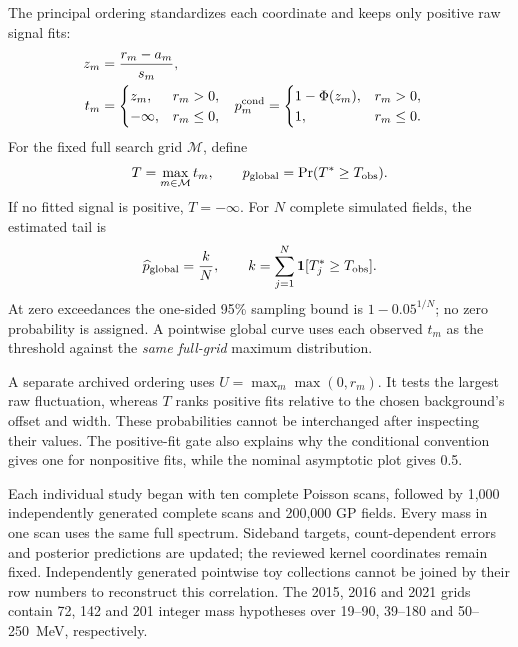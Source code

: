 The principal ordering standardizes each coordinate and keeps only
positive raw signal fits:
\begin{align}
 z_m&=\frac{r_m-a_m}{s_m},\\
 t_m&=\begin{cases}z_m,&r_m>0,\\-\infty,&r_m\leq0,\end{cases}
 &p_m^{\rm cond}&=\begin{cases}1-\Phi(z_m),&r_m>0,\\1,&r_m\leq0.\end{cases}
 \label{eq:v501-local-ordering}
\end{align}
For the fixed full search grid $\mathcal M$, define
\begin{equation}
 T=\max_{m\in\mathcal M}t_m,
 \qquad
 p_{\rm global}=\Pr(T^*\geq T_{\rm obs}).
 \label{v5-eq:global-ordering}
\end{equation}
If no fitted signal is positive, $T=-\infty$. For $N$ complete simulated
fields, the estimated tail is
\begin{equation}
 \widehat p_{\rm global}=\frac{k}{N},
 \qquad k=\sum_{j=1}^{N}\mathbf1[T_j^*\geq T_{\rm obs}].
 \label{eq:v501-global-mc-tail}
\end{equation}
At zero exceedances the one-sided 95\% sampling bound is
$1-0.05^{1/N}$; no zero probability is assigned. A pointwise global curve
uses each observed $t_m$ as the threshold against the \emph{same full-grid}
maximum distribution.

A separate archived ordering uses $U=\max_m\max(0,r_m)$. It tests the
largest raw fluctuation, whereas $T$ ranks positive fits relative to the
chosen background's offset and width. These probabilities cannot be
interchanged after inspecting their values. The positive-fit gate also
explains why the conditional convention gives one for nonpositive fits,
while the nominal asymptotic plot gives 0.5.

Each individual study began with ten complete Poisson scans, followed by
1,000 independently generated complete scans and 200,000 GP fields.
Every mass in one scan uses the same full spectrum. Sideband targets,
count-dependent errors and posterior predictions are updated; the reviewed
kernel coordinates remain fixed. Independently generated pointwise toy
collections cannot be joined by their row numbers to reconstruct this
correlation. The 2015, 2016 and 2021 grids contain 72, 142 and 201 integer
mass hypotheses over 19--90, 39--180 and 50--250~MeV, respectively.

